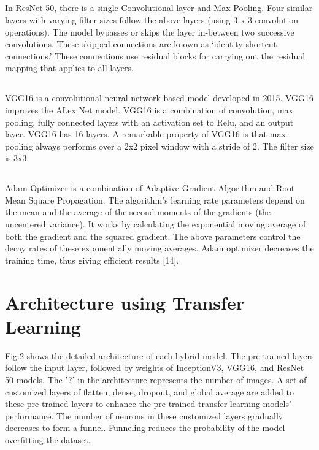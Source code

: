\documentclass[conference]{IEEEtran}
\begin{document}
\subsection{}
In ResNet-50, there is a  single Convolutional layer and Max Pooling. Four similar layers with varying filter sizes follow the above layers (using 3 x 3 convolution operations). The model bypasses or skips the layer in-between two successive convolutions. These skipped connections are known as ‘identity shortcut connections.’ These connections use residual blocks for carrying out the residual mapping that applies to all layers.

\subsection{}
VGG16 is a convolutional neural network-based model developed in 2015. VGG16 improves the ALex Net model. VGG16 is  a  combination of convolution, max pooling, fully connected layers with an activation set to Relu, and an output layer. VGG16 has 16 layers. A remarkable property  of VGG16 is that max-pooling always performs over a 2x2 pixel window with a stride of 2. The filter size is 3x3.


\subsection{}

Adam Optimizer is a combination of Adaptive Gradient Algorithm and Root Mean Square Propagation. The algorithm’s learning rate parameters depend on the mean and the average of the second moments of the gradients (the uncentered variance). It works by calculating the exponential moving average of both the gradient and the squared gradient. The above parameters control the decay rates of these exponentially moving averages.  Adam optimizer decreases the training time, thus giving efficient results [14].





\section{Architecture using Transfer Learning}

Fig.2 shows the detailed architecture of each hybrid model. The pre-trained layers follow the input layer, followed by weights of InceptionV3, VGG16, and ResNet 50 models. The '?' in the architecture represents the number of images. A set of customized layers of flatten, dense, dropout, and global average are added to these pre-trained layers to enhance the pre-trained transfer learning models’ performance. The number of neurons in these customized layers gradually decreases to form a funnel. Funneling reduces the probability of the model overfitting the dataset.
\end{document}
